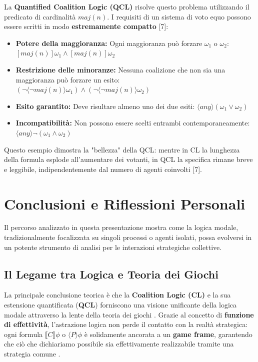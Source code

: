 \documentclass[12pt]{article}
\newcommand{\CL}[1]{\llbracket #1 \rrbracket}
\begin{document}
La \textbf{Quantified Coalition Logic (QCL)} risolve questo problema
utilizzando il predicato di cardinalità $maj(n)$. I requisiti di un sistema
di voto equo possono essere scritti in modo \textbf{estremamente compatto} [7]:

\begin{itemize}
	\item \textbf{Potere della maggioranza:} Ogni maggioranza può forzare
	      $\omega_1$ o $\omega_2$:
	      $[maj(n)]\omega_1 \land [maj(n)]\omega_2$
	\item \textbf{Restrizione delle minoranze:} Nessuna coalizione che non
	      sia una maggioranza può forzare un esito:
	      $(\neg \langle \neg maj(n) \rangle \omega_1) \land (\neg \langle \neg maj(n) \rangle \omega_2)$
	\item \textbf{Esito garantito:} Deve risultare almeno uno dei due esiti:
	      $\langle any \rangle (\omega_1 \lor \omega_2)$
	\item \textbf{Incompatibilità:} Non possono essere scelti entrambi
	      contemporaneamente:
	      $\langle any \rangle \neg (\omega_1 \land \omega_2)$
\end{itemize}

Questo esempio dimostra la "bellezza" della QCL: mentre in CL la lunghezza
della formula esplode all'aumentare dei votanti, in QCL la specifica rimane
breve e leggibile, indipendentemente dal numero di agenti coinvolti [7].
\section{Conclusioni e Riflessioni Personali}
Il percorso analizzato in questa presentazione mostra come la logica modale,
tradizionalmente focalizzata su singoli processi o agenti isolati, possa
evolversi in un potente strumento di analisi per le interazioni strategiche
collettive.

\subsection{Il Legame tra Logica e Teoria dei Giochi}

La principale conclusione teorica è che la \textbf{Coalition Logic (CL)} e la
sua estensione quantificata (\textbf{QCL}) forniscono una visione
unificante della logica modale attraverso la lente della teoria dei giochi
. Grazie al concetto di \textbf{funzione di effettività},
l'astrazione logica non perde il contatto con la realtà strategica: ogni
formula $\CL{C} \phi$ o $\langle P \rangle \phi$ è solidamente ancorata a un
\textbf{game frame}, garantendo che ciò che dichiariamo possibile sia
effettivamente realizzabile tramite una strategia comune .
\end{document}
